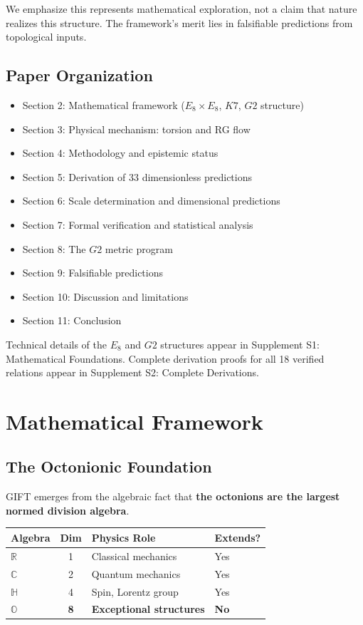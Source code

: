 \documentclass[11pt,a4paper]{article}
\newcommand{\E}{\mathrm{E}}
\newcommand{\Gtwo}{\mathrm{G}_2}
\newcommand{\Kseven}{K_7}
\def\Gtwo{G2}%
\def\Kseven{K7}%
\def\E{E}%
\begin{document}
We emphasize this represents mathematical exploration, not a claim that nature realizes this structure. The framework's merit lies in falsifiable predictions from topological inputs.

\subsection{Paper Organization}

\begin{itemize}
\item Section 2: Mathematical framework ($\E_8 \times \E_8$, $\Kseven$, $\Gtwo$ structure)
\item Section 3: Physical mechanism: torsion and RG flow
\item Section 4: Methodology and epistemic status
\item Section 5: Derivation of 33 dimensionless predictions
\item Section 6: Scale determination and dimensional predictions
\item Section 7: Formal verification and statistical analysis
\item Section 8: The $\Gtwo$ metric program
\item Section 9: Falsifiable predictions
\item Section 10: Discussion and limitations
\item Section 11: Conclusion
\end{itemize}

Technical details of the $\E_8$ and $\Gtwo$ structures appear in Supplement S1: Mathematical Foundations. Complete derivation proofs for all 18 verified relations appear in Supplement S2: Complete Derivations.

\section{Mathematical Framework}

\subsection{The Octonionic Foundation}

GIFT emerges from the algebraic fact that \textbf{the octonions are the largest normed division algebra}.

\begin{table}[H]
\centering
\begin{tabular}{lcll}
\toprule
Algebra & Dim & Physics Role & Extends? \\
\midrule
$\mathbb{R}$ & 1 & Classical mechanics & Yes \\
$\mathbb{C}$ & 2 & Quantum mechanics & Yes \\
$\mathbb{H}$ & 4 & Spin, Lorentz group & Yes \\
$\mathbf{\mathbb{O}}$ & \textbf{8} & \textbf{Exceptional structures} & \textbf{No} \\
\bottomrule
\end{tabular}
\end{table}
\end{document}
